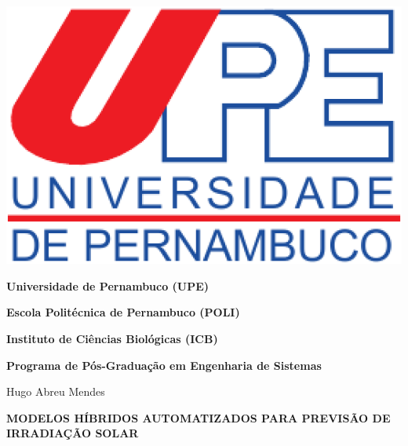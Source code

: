 \begin{center}
\begin{minipage}[b]{0.15\linewidth}
\end{minipage} \hfill
\begin{minipage}[b]{0.15\linewidth}
\includegraphics[width=\textwidth]{Figuras/Capa/upelogo.eps}
\end{minipage}

{\textbf{Universidade de Pernambuco (UPE)}}%

{\textbf{Escola Politécnica de Pernambuco (POLI)}}%

{\textbf{Instituto de Ciências Biológicas (ICB)}} \\ \vspace{2ex}

{\textbf{Programa de Pós-Graduação em Engenharia de Sistemas}} \\ \vspace{1ex}

\vspace{0.8in}

{\Large Hugo Abreu Mendes}\\

\vspace{1in}

{\Large \textbf{MODELOS HÍBRIDOS AUTOMATIZADOS PARA PREVISÃO DE IRRADIAÇÃO SOLAR}} \\

\vspace{0.3in}




\end{center}

